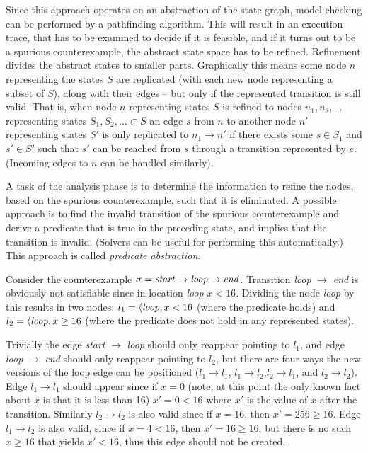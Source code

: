 Since this approach operates on an abstraction of the state graph, model checking can be performed by a pathfinding algorithm. This will result in an execution trace, that has to be examined to decide if it is feasible, and if it turns out to be a spurious counterexample, the abstract state space has to be refined. Refinement divides the abstract states to smaller parts. Graphically this means some node $n$ representing the states $S$ are replicated (with each new node representing a subset of $S$), along with their edges -- but only if the represented transition is still valid. That is, when node $n$ representing states $S$ is refined to nodes $n_1,n_2,\dots$ representing states $S_1,S_2,\dots \subset S$ an edge $s$ from $n$ to another node $n'$ representing states $S'$ is only replicated to $n_1 \to n'$ if there exists some $s \in S_1$ and $s' \in S'$ such that $s'$ can be reached from $s$ through a transition represented by $e$. (Incoming edges to $n$ can be handled similarly).

A task of the analysis phase is to determine the information to refine the nodes, based on the spurious counterexample, such that it is eliminated. A possible approach is to find the invalid transition of the spurious counterexample and derive a predicate that is true in the preceding state, and implies that the transition is invalid. (Solvers can be useful for performing this automatically.) This approach is called \emph{predicate abstraction}.

 \begin{example}
 	Consider the counterexample $\sigma = \text{\emph{start}} \to \text{\emph{loop}} \to \text{\emph{end}}$. Transition \emph{loop} $\to$ \emph{end} is obviously not satisfiable since in location \emph{loop} $x<16$. Dividing the node \emph{loop} by this results in two nodes: $l_1=\langle \text{\emph{loop}}, x<16$ (where the predicate holds) and $l_2=\langle \text{\emph{loop}}, x \geq 16$ (where the predicate does not hold in any represented states).
 	
 	Trivially the edge \emph{start} $\to$ \emph{loop} should only reappear pointing to $l_1$, and edge \emph{loop} $\to$ \emph{end} should only reappear pointing to $l_2$, but there are four ways the new versions of the loop edge can be positioned ($l_1 \to l_1$, $l_1 \to l_2$,$l_2 \to l_1$, and $l_2 \to l_2$). Edge $l_1 \to l_1$ should appear since if $x=0$ (note, at this point the only known fact about $x$ is that it is less than 16) $x'=0<16$ where $x'$ is the value of $x$ after the transition. Similarly $l_2 \to l_2$ is also valid since if $x=16$, then $x'=256 \geq 16$. Edge $l_1 \to l_2$ is also valid, since if $x=4<16$, then $x'=16 \geq 16$, but there is no such $x \geq 16$ that yields $x'<16$, thus this edge should not be created. 
 \end{example}



